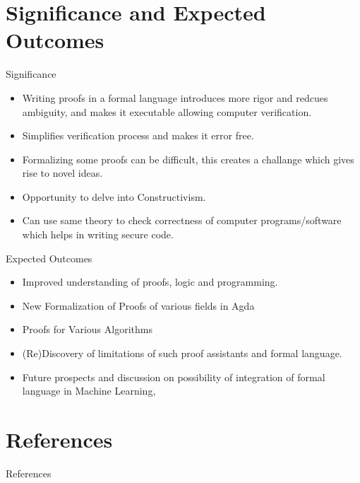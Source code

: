 \documentclass{beamer}
\begin{document}
\section{Significance and Expected Outcomes}
\begin{frame}{Significance}
  \begin{itemize}
    \item Writing proofs in a formal language introduces more rigor and redcues ambiguity, and makes it executable allowing computer verification.
    \item Simplifies verification process and makes it error free.
     \item Formalizing some proofs can be difficult, this creates a challange which gives rise to novel ideas.
    \item Opportunity to delve into Constructivism.
    \item Can use same theory to check correctness of computer programs/software which helps in writing secure code. 
  \end{itemize}

\end{frame}
\begin{frame}{Expected Outcomes}
  \begin{itemize}
    \item Improved understanding of proofs, logic and programming.
    \item New Formalization of Proofs of various fields in Agda 
    \item Proofs for Various Algorithms
    \item (Re)Discovery of limitations of such proof assistants and formal language.
    \item Future prospects and discussion on possibility of integration of formal language in Machine Learning,
  \end{itemize}
\end{frame}

\section{References}
\begin{frame}{References}
       
 
\end{frame}

       
\end{document}
